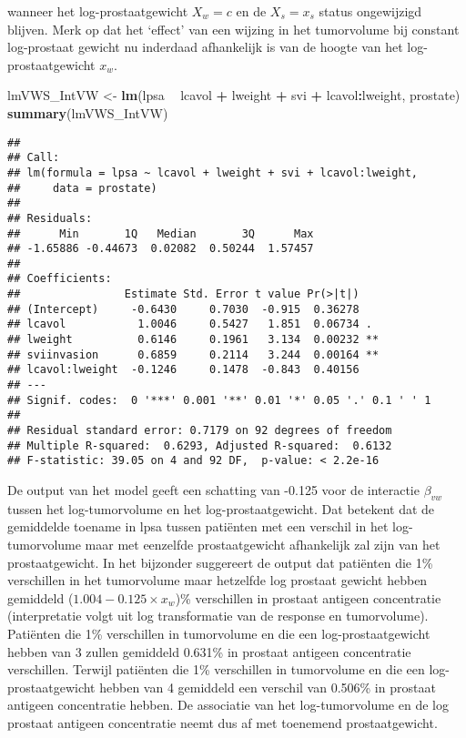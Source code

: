 \documentclass[12pt,dutch,coursenotes]{book}
\newenvironment{Shaded}{\begin{snugshade}}{\end{snugshade}}
\newcommand{\KeywordTok}[1]{\textcolor[rgb]{0.13,0.29,0.53}{\textbf{#1}}}
\newcommand{\StringTok}[1]{\textcolor[rgb]{0.31,0.60,0.02}{#1}}
\newcommand{\OperatorTok}[1]{\textcolor[rgb]{0.81,0.36,0.00}{\textbf{#1}}}
\newcommand{\NormalTok}[1]{#1}
\theoremstyle{definition}
\theoremstyle{definition}
\theoremstyle{definition}
\theoremstyle{remark}
\begin{document}
wanneer het log-prostaatgewicht \(X_w=c\) en de \(X_s=x_s\) status
ongewijzigd blijven. Merk op dat het `effect' van een wijzing in het
tumorvolume bij constant log-prostaat gewicht nu inderdaad afhankelijk
is van de hoogte van het log-prostaatgewicht \(x_w\).

\begin{Shaded}
\begin{Highlighting}[]
\NormalTok{lmVWS_IntVW <-}\StringTok{ }\KeywordTok{lm}\NormalTok{(lpsa }\OperatorTok{~}\StringTok{ }\NormalTok{lcavol }\OperatorTok{+}\StringTok{ }\NormalTok{lweight }\OperatorTok{+}\StringTok{ }\NormalTok{svi }\OperatorTok{+}\StringTok{ }\NormalTok{lcavol}\OperatorTok{:}\NormalTok{lweight, }
\NormalTok{    prostate)}
\KeywordTok{summary}\NormalTok{(lmVWS_IntVW)}
\end{Highlighting}
\end{Shaded}

\begin{verbatim}
## 
## Call:
## lm(formula = lpsa ~ lcavol + lweight + svi + lcavol:lweight, 
##     data = prostate)
## 
## Residuals:
##      Min       1Q   Median       3Q      Max 
## -1.65886 -0.44673  0.02082  0.50244  1.57457 
## 
## Coefficients:
##                Estimate Std. Error t value Pr(>|t|)   
## (Intercept)     -0.6430     0.7030  -0.915  0.36278   
## lcavol           1.0046     0.5427   1.851  0.06734 . 
## lweight          0.6146     0.1961   3.134  0.00232 **
## sviinvasion      0.6859     0.2114   3.244  0.00164 **
## lcavol:lweight  -0.1246     0.1478  -0.843  0.40156   
## ---
## Signif. codes:  0 '***' 0.001 '**' 0.01 '*' 0.05 '.' 0.1 ' ' 1
## 
## Residual standard error: 0.7179 on 92 degrees of freedom
## Multiple R-squared:  0.6293, Adjusted R-squared:  0.6132 
## F-statistic: 39.05 on 4 and 92 DF,  p-value: < 2.2e-16
\end{verbatim}

De output van het model geeft een schatting van -0.125 voor de
interactie \(\beta_{vw}\) tussen het log-tumorvolume en het
log-prostaatgewicht. Dat betekent dat de gemiddelde toename in lpsa
tussen patiënten met een verschil in het log-tumorvolume maar met
eenzelfde prostaatgewicht afhankelijk zal zijn van het prostaatgewicht.
In het bijzonder suggereert de output dat patiënten die 1\% verschillen
in het tumorvolume maar hetzelfde log prostaat gewicht hebben gemiddeld
(\(1.004-0.125 \times x_w\))\% verschillen in prostaat antigeen
concentratie (interpretatie volgt uit log transformatie van de response
en tumorvolume). Patiënten die 1\% verschillen in tumorvolume en die een
log-prostaatgewicht hebben van 3 zullen gemiddeld 0.631\% in prostaat
antigeen concentratie verschillen. Terwijl patiënten die 1\% verschillen
in tumorvolume en die een log-prostaatgewicht hebben van 4 gemiddeld een
verschil van 0.506\% in prostaat antigeen concentratie hebben. De
associatie van het log-tumorvolume en de log prostaat antigeen
concentratie neemt dus af met toenemend prostaatgewicht.
\end{document}
